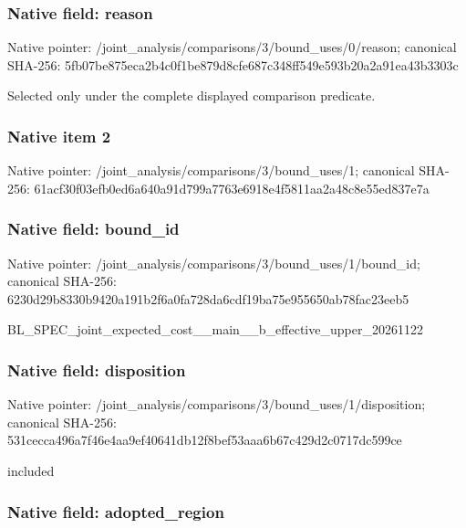 \documentclass[10pt,a4paper]{article}
\begin{document}
\subsubsection{Native field: reason}


Native pointer: /joint\_analysis/comparis\allowbreak{}ons/3/bound\_uses/0/reaso\allowbreak{}n; canonical SHA-256: 5fb07be875eca2b4c0f1be87\allowbreak{}9d8cfe687c348ff549e593b2\allowbreak{}0a2a91ea43b3303c


Selected only under the complete displayed comparison predicate.


\subsubsection{Native item 2}


Native pointer: /joint\_analysis/comparis\allowbreak{}ons/3/bound\_uses/1; canonical SHA-256: 61acf30f03efb0ed6a640a91\allowbreak{}d799a7763e6918e4f5811aa2\allowbreak{}a48c8e55ed837e7a



\subsubsection{Native field: bound\_id}


Native pointer: /joint\_analysis/comparis\allowbreak{}ons/3/bound\_uses/1/bound\allowbreak{}\_id; canonical SHA-256: 6230d29b8330b9420a191b2f\allowbreak{}6a0fa728da6cdf19ba75e955\allowbreak{}650ab78fac23eeb5


BL\_SPEC\_joint\_expected\_c\allowbreak{}ost\_\_main\_\_b\_effective\_u\allowbreak{}pper\_20261122


\subsubsection{Native field: disposition}


Native pointer: /joint\_analysis/comparis\allowbreak{}ons/3/bound\_uses/1/dispo\allowbreak{}sition; canonical SHA-256: 531cecca496a7f46e4aa9ef4\allowbreak{}0641db12f8bef53aaa6b67c4\allowbreak{}29d2c0717dc599ce


included


\subsubsection{Native field: adopted\_region}
\end{document}
